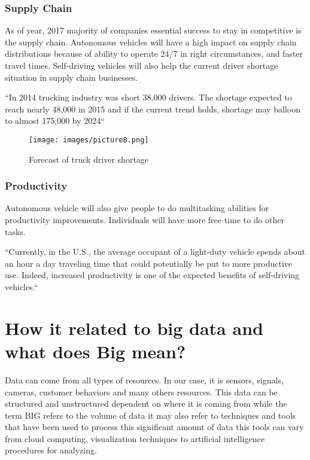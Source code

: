 \documentclass[sigconf]{acmart}
\begin{document}
\subsubsection{Supply Chain} As of year, 2017 majority of companies essential success to stay in competitive is the supply chain.  Autonomous vehicles will have a high impact on supply chain distributions because of ability to operate 24/7 in right circumstances, and faster travel times. Self-driving vehicles will also help the current driver shortage situation in supply chain businesses.

    ``In 2014 trucking industry was short 38,000 drivers. The shortage expected to reach nearly 48,000 in 2015 and if the current trend holds, shortage may balloon to almost 175,000 by 2024``\cite{ATA}

\begin{figure}[!ht]
  \centering
      \texttt{[image: images/picture8.png]}
  \caption{Forecast of truck driver shortage}\label{F:small}
\end{figure}

\subsubsection{Productivity}Autonomous vehicle will also give people to do multitasking abilities for productivity improvements. Individuals will have more free time to do other tasks. 

``Currently, in the U.S., the average occupant of a light-duty vehicle spends about an hour a day traveling time that could potentially be put to more productive use. Indeed, increased productivity is one of the expected benefits of self-driving vehicles.``\cite{michigan}



\section{How it related to big data and what does Big mean?}
\par Data can come from all types of resources. In our case, it is sensors, signals, cameras, customer behaviors and many others resources. This data can be structured and unstructured dependent on where it is coming from while the term BIG refers to the volume of data it may also refer to techniques and tools that have been used to process this significant amount of data this tools can vary from cloud computing, visualization techniques to artificial intelligence procedures for analyzing.\cite{www-webo}
\end{document}
